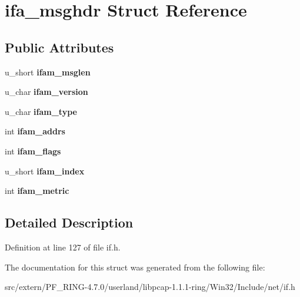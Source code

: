 \hypertarget{structifa__msghdr}{
\section{ifa\_\-msghdr Struct Reference}
\label{structifa__msghdr}
}
\subsection*{Public Attributes}
\begin{DoxyCompactItemize}
\item 
\hypertarget{structifa__msghdr_ab14e988d75fb0bde25e0df01da05a81b}{
u\_\-short {\bfseries ifam\_\-msglen}}
\label{structifa__msghdr_ab14e988d75fb0bde25e0df01da05a81b}

\item 
\hypertarget{structifa__msghdr_ae4606695931cf73d20070ffc1a1174c3}{
u\_\-char {\bfseries ifam\_\-version}}
\label{structifa__msghdr_ae4606695931cf73d20070ffc1a1174c3}

\item 
\hypertarget{structifa__msghdr_afc0777c2cbf3fcca571714115ad594d9}{
u\_\-char {\bfseries ifam\_\-type}}
\label{structifa__msghdr_afc0777c2cbf3fcca571714115ad594d9}

\item 
\hypertarget{structifa__msghdr_a3c78711ed495d4e91dca3a9790ef03e0}{
int {\bfseries ifam\_\-addrs}}
\label{structifa__msghdr_a3c78711ed495d4e91dca3a9790ef03e0}

\item 
\hypertarget{structifa__msghdr_a5e92c955b782fa492ff196c3c3f8e615}{
int {\bfseries ifam\_\-flags}}
\label{structifa__msghdr_a5e92c955b782fa492ff196c3c3f8e615}

\item 
\hypertarget{structifa__msghdr_a6ee4a5163e128fff6e134bbd078c79d8}{
u\_\-short {\bfseries ifam\_\-index}}
\label{structifa__msghdr_a6ee4a5163e128fff6e134bbd078c79d8}

\item 
\hypertarget{structifa__msghdr_afb6124882726ee0ba58649d7d287cc50}{
int {\bfseries ifam\_\-metric}}
\label{structifa__msghdr_afb6124882726ee0ba58649d7d287cc50}

\end{DoxyCompactItemize}


\subsection{Detailed Description}


Definition at line 127 of file if.h.



The documentation for this struct was generated from the following file:\begin{DoxyCompactItemize}
\item 
src/extern/PF\_\-RING-\/4.7.0/userland/libpcap-\/1.1.1-\/ring/Win32/Include/net/if.h\end{DoxyCompactItemize}
